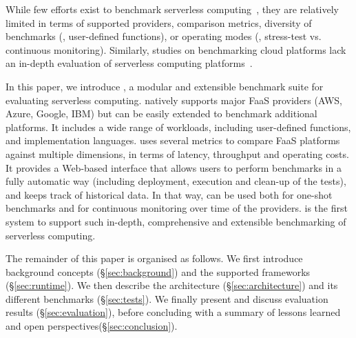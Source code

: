 While few efforts exist to benchmark serverless computing~\cite{doi:10.1002/cpe.4792, Kuntsevich:2018:DAB:3284014.3284016, EoPSCE, 10.1007/978-3-319-75178-8_34}, they are relatively limited in terms of supported providers, comparison metrics, diversity of benchmarks (\eg, user-defined functions), or operating modes (\eg, stress-test vs. continuous monitoring).
Similarly, studies on benchmarking cloud platforms lack an in-depth evaluation of serverless computing platforms~\cite{Gan:2019:OBS:3297858.3304013}. 

In this paper, we introduce \sys, a modular and extensible benchmark suite for evaluating serverless computing.
\sys natively supports major FaaS providers (AWS, Azure, Google, IBM) but can be easily extended to benchmark additional platforms.
It includes a wide range of workloads, including user-defined functions, and implementation languages.
\sys uses several metrics to compare FaaS platforms against multiple dimensions, in terms of latency, throughput and operating costs.
It provides a Web-based interface that allows users to perform benchmarks in a fully automatic way (including deployment, execution and clean-up of the tests), and keeps track of historical data.
In that way, \sys can be used both for one-shot benchmarks and for continuous monitoring over time of the providers.
\sys is the first system to support such in-depth, comprehensive and extensible benchmarking of serverless computing.

The remainder of this paper is organised as follows.
We first introduce background concepts (\S\ref{sec:background}) and the supported frameworks (\S\ref{sec:runtime}).
We then describe the \sys architecture (\S\ref{sec:architecture}) and its different benchmarks (\S\ref{sec:tests}).
We finally present and discuss evaluation results (\S\ref{sec:evaluation}), before concluding with a summary of lessons learned  and open perspectives(\S\ref{sec:conclusion}).

